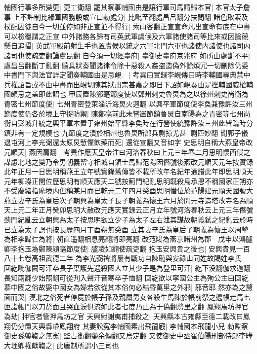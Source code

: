 輔國行事多所變更|{
	更工衛翻}
罷其察事輔國由是讓行軍司馬請歸本官|{
	本官太子詹事}
上不許制比緣軍國務殷或宣口勑處分|{
	比毗至翻處昌呂翻分扶問翻}
諸色取索及杖配囚徒自今一切並停如非正宣並不得行|{
	索山客翻正宣宣命凡出宣命有㡳在中書可以檢覆謂之正宣}
中外諸務各歸有司英武軍虞候及六軍諸使諸司等比來或因論競懸自追攝|{
	英武軍殿前射生手也置虞候以統之六軍北門六軍也諸使内諸使也諸司内諸司也使疏吏翻論盧昆翻}
自今須一切經臺府|{
	臺御史臺府京兆府}
如所由處斷不平|{
	處昌呂翻斷丁亂翻}
聽具狀奏聞諸律令除十惡殺人姦盗造偽外餘煩冗一切刪除仍委中書門下與法官詳定聞奏輔國由是忌峴　|{
	考異曰實録李峴傳曰時李輔國專典禁中兵權詔旨或不由中書而出峴切陳其狀肅宗甚嘉之即日下詔如峴奏由是挫輔國威權輔國頗忌之盖即此詔也}
甲辰置陳鄭亳節度使以鄧州刺史魯炅為之以徐州刺史尚衡為青密七州節度使|{
	七州青密登萊淄沂海炅火迥翻}
以興平軍節度使李奐兼豫許汝三州節度使仍各於境上守捉防禦|{
	陳鄭亳前此未嘗置節鎮魯炅自南陽為之青密等七州尚衡自彭城升統之興平軍本置于雍州始平縣李奐時在行營使統豫許汝三州此皆臨時分鎮非有一定規模也}
九節度之潰於相州也魯炅所部兵剽掠尤甚|{
	剽匹妙翻}
聞郭子儀退屯河上李光弼還太原炅慙懼飲藥而死|{
	還從宣翻又音如字}
史思明自稱大燕皇帝改元順天|{
	燕因肩翻　考異作應天皇帝注曰河洛春秋曰上元三年春二月思明懷西侵之謀慮北地之變乃令男朝義留守相城自領士馬歸范陽因僭號後燕改元順天元年按實録此年正月一日思明稱燕王立年號實錄舊傳皆不載所改年名紀年通譜此年即思明順天元年柳璨正閏位歷思明有順天應天二號按薊門紀亂思明既殺烏承恩不稱國家正朔亦不受慶緒指麾境内但稱某月而已乾元二年四月癸酉思明僭位於范陽建元順天國號大燕立妻辛氏為皇后次子朝興為皇太子長子朝義為懷王六月於開元寺造塔改寺名為順天上元二年正月癸卯思明大赦改元應天實録云正月立年號河洛春秋云上元三年僭號薊門紀亂云立朝興為太子按思明欲立少子為太子左右泄其謀故朝義弑之紀亂云於時已立為太子誤也按長歷四月丁酉朔無癸酉}
立其妻辛氏為皇后子朝義為懷王以周摯為相李歸仁為將|{
	朝直遥翻相息亮翻將即亮翻}
改范陽為燕京諸州為郡　戊申以鴻臚卿李抱玉為鄭陳潁亳節度使|{
	臚凌如翻使疏吏翻}
抱玉安興貴之後也|{
	安興貴見一百八十七卷高祖武德二年}
為李光弼禆將屢有戰功自陳恥與安祿山同姓故賜姓李氏　回紇毗伽闕可汗卒長子葉護先遇殺國人立其少子是為登里可汗|{
	紇下没翻伽求迦翻長知兩翻少始照翻可從刋入聲汗音寒卒子恤翻}
回紇欲以寜國公主為殉公主曰回紇慕中國之俗故娶中國女為婦若欲從其本俗何必結昏萬里之外邪|{
	邪音耶}
然亦為之剺面而哭|{
	漠北之俗死者停屍於帳子孫及親屬男女各殺牛馬陳於帳前祭之遶帳走馬七匝詣帳門以刀剺面且哭血淚俱流如此者七度乃止為于偽翻剺里之翻}
鳳翔馬坊押官為劫|{
	押官者管押馬坊之官}
天興尉謝夷甫捕殺之|{
	天興縣本古雍縣至德二載改曰鳳翔仍分置天興縣帶鳳翔府}
其妻訟寃李輔國素出飛龍廐|{
	李輔國本飛龍小兒}
勑監察御史孫鎣鞫之無寃|{
	監古銜翻鎣余傾翻又烏定翻}
又使御史中丞崔伯陽刑部侍郎李曄大理卿權獻鞫之|{
	此唐制所謂小三司也}
